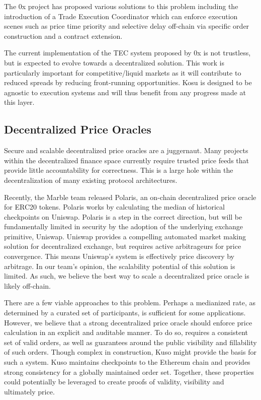 \documentclass[10pt]{article}
\begin{document}
The 0x project has proposed various solutions to this problem including the introduction of a Trade Execution Coordinator which can enforce execution scenes such as price time priority and selective delay off-chain via specific order construction and a contract extension\cite{0x-selective-delay}.
\medskip

The current implementation of the TEC system proposed by 0x is not trustless, but is expected to evolve towards a decentralized solution\cite{0x-coordinator-specification}. This work is particularly important for competitive/liquid markets as it will contribute to reduced spreads by reducing front-running opportunities. Kosu is designed to be agnostic to execution systems and will thus benefit from any progress made at this layer.

\subsection{Decentralized Price Oracles}\label{future-work-oracles}
Secure and scalable decentralized price oracles are a juggernaut. Many projects within the decentralized finance space currently require trusted price feeds that provide little accountability for correctness. This is a large hole within the decentralization of many existing protocol architectures.
\medskip

Recently, the Marble team released Polaris, an on-chain decentralized price oracle for ERC20 tokens. Polaris works by calculating the median of historical checkpoints on Uniswap\cite{polaris-intro-article}. Polaris is a step in the correct direction, but will be fundamentally limited in security by the adoption of the underlying exchange primitive, Uniswap. Uniswap provides a compelling automated market making solution for decentralized exchange, but requires active arbitrageurs for price convergence. This means Uniswap’s system is effectively price discovery by arbitrage. In our team’s opinion, the scalability potential of this solution is limited\cite{uniswap-docs}. As such, we believe the best way to scale a decentralized price oracle is likely off-chain. 
\medskip

There are a few viable approaches to this problem. Perhaps a medianized rate, as determined by a curated set of participants, is sufficient for some applications. However, we believe that a strong decentralized price oracle should enforce price calculation in an explicit and auditable manner. To do so, requires a consistent set of valid orders, as well as guarantees around the public visibility and fillability of such orders. Though complex in construction, Kuso might provide the basis for such a system. Kuso maintains checkpoints to the Ethereum chain and provides strong consistency for a globally maintained order set. Together, these properties could potentially be leveraged to create proofs of validity, visibility and ultimately price. 
\medskip
\end{document}
